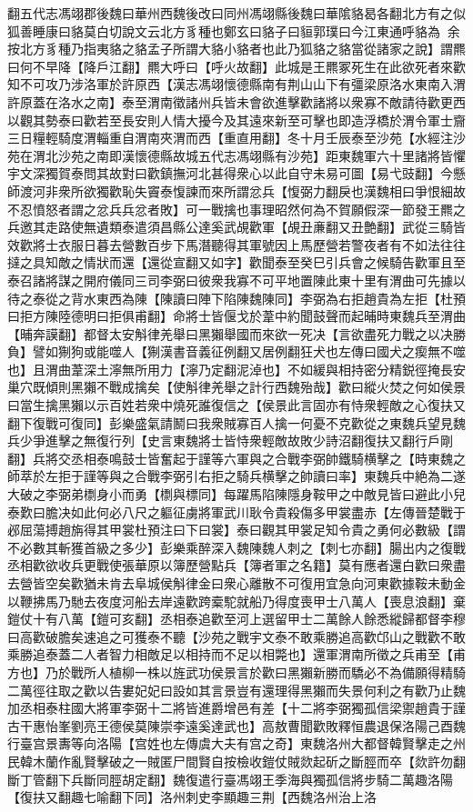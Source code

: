 翻五代志馮翊郡後魏曰華州西魏後改曰同州馮翊縣後魏曰華隂貉曷各翻北方有之似狐善睡康曰貉莫白切說文云北方豸種也鄭玄曰貉子曰貆郭璞曰今江東通呼貉為余按北方豸種乃指夷貉之貉孟子所謂大貉小貉者也此乃狐貉之貉當從諸家之說】謂羆曰何不早降【降戶江翻】羆大呼曰【呼火故翻】此城是王羆冢死生在此欲死者來歡知不可攻乃涉洛軍於許原西【漢志馮翊懷德縣南有荆山山下有彊梁原洛水東南入渭許原蓋在洛水之南】泰至渭南徵諸州兵皆未會欲進擊歡諸將以衆寡不敵請待歡更西以觀其勢泰曰歡若至長安則人情大擾今及其遠來新至可擊也即造浮橋於渭令軍士齎三日糧輕騎度渭輜重自渭南夾渭而西【重直用翻】冬十月壬辰泰至沙苑【水經注沙苑在渭北沙苑之南即漢懷德縣故城五代志馮翊縣有沙苑】距東魏軍六十里諸將皆懼宇文深獨賀泰問其故對曰歡鎮撫河北甚得衆心以此自守未易可圖【易弋豉翻】今懸師渡河非衆所欲獨歡恥失竇泰愎諫而來所謂忿兵【愎弼力翻戾也漢魏相曰爭恨細故不忍憤怒者謂之忿兵兵忿者敗】可一戰擒也事理昭然何為不賀願假深一節發王羆之兵邀其走路使無遺類泰遣須昌縣公達奚武覘歡軍【覘丑亷翻又丑艶翻】武從三騎皆效歡將士衣服日暮去營數百步下馬潛聽得其軍號因上馬歷營若警夜者有不如法往往撻之具知敵之情狀而還【還從宣翻又如字】歡聞泰至癸巳引兵會之候騎告歡軍且至泰召諸將謀之開府儀同三司李弼曰彼衆我寡不可平地置陳此東十里有渭曲可先據以待之泰從之背水東西為陳【陳讀曰陣下陷陳魏陳同】李弼為右拒趙貴為左拒【杜預曰拒方陳陸德明曰拒俱甫翻】命將士皆偃戈於葦中約聞鼓聲而起晡時東魏兵至渭曲【晡奔謨翻】都督太安斛律羌舉曰黑獺舉國而來欲一死决【言欲盡死力戰之以决勝負】譬如猘狗或能噬人【猘漢書音義征例翻又居例翻狂犬也左傳曰國犬之瘈無不噬也】且渭曲葦深土濘無所用力【濘乃定翻泥淖也】不如緩與相持密分精鋭徑掩長安巢穴既傾則黑獺不戰成擒矣【使斛律羌舉之計行西魏殆哉】歡曰縱火焚之何如侯景曰當生擒黑獺以示百姓若衆中燒死誰復信之【侯景此言固亦有恃衆輕敵之心復扶又翻下復戰可復同】彭樂盛氣請鬭曰我衆賊寡百人擒一何憂不克歡從之東魏兵望見魏兵少爭進擊之無復行列【史言東魏將士皆恃衆輕敵故敗少詩沼翻復扶又翻行戶剛翻】兵將交丞相泰鳴鼓士皆奮起于謹等六軍與之合戰李弼帥鐵騎横擊之【時東魏之師萃於左拒于謹等與之合戰李弼引右拒之騎兵横擊之帥讀曰率】東魏兵中絶為二遂大破之李弼弟檦身小而勇【檦與標同】每躍馬陷陳隱身鞍甲之中敵見皆曰避此小兒泰歎曰膽决如此何必八尺之軀征虜將軍武川耿令貴殺傷多甲裳盡赤【左傳晉楚戰于邲屈蕩搏趙旃得其甲裳杜預注曰下曰裳】泰曰觀其甲裳足知令貴之勇何必數級【謂不必數其斬獲首級之多少】彭樂乘醉深入魏陳魏人刺之【刺七亦翻】腸出内之復戰丞相歡欲收兵更戰使張華原以簿歷營點兵【簿者軍之名籍】莫有應者還白歡曰衆盡去營皆空矣歡猶未肯去阜城侯斛律金曰衆心離散不可復用宜急向河東歡據鞍未動金以鞭拂馬乃馳去夜度河船去岸遠歡跨槖駝就船乃得度喪甲士八萬人【喪息浪翻】棄鎧仗十有八萬【鎧可亥翻】丞相泰追歡至河上選留甲士二萬餘人餘悉縱歸都督李穆曰高歡破膽矣速追之可獲泰不聽【沙苑之戰宇文泰不敢乘勝追高歡邙山之戰歡不敢乘勝追泰蓋二人者智力相敵足以相持而不足以相斃也】還軍渭南所徵之兵甫至【甫方也】乃於戰所人植柳一株以旌武功侯景言於歡曰黑獺新勝而驕必不為備願得精騎二萬徑往取之歡以告婁妃妃曰設如其言景豈有還理得黑獺而失景何利之有歡乃止魏加丞相泰柱國大將軍李弼十二將皆進爵增邑有差【十二將李弼獨孤信梁禦趙貴于謹古干惠怡峯劉亮王德侯莫陳崇李遠奚達武也】高敖曹聞歡敗釋恒農退保洛陽己酉魏行臺宫景夀等向洛陽【宫姓也左傳虞大夫有宫之奇】東魏洛州大都督韓賢擊走之州民韓木蘭作亂賢擊破之一賊匿尸間賢自按檢收鎧仗賊欻起斫之斷脛而卒【欻許勿翻斷丁管翻下兵斷同脛胡定翻】魏復遣行臺馮翊王季海與獨孤信將步騎二萬趣洛陽【復扶又翻趣七喻翻下同】洛州刺史李顯趣三荆【西魏洛州治上洛